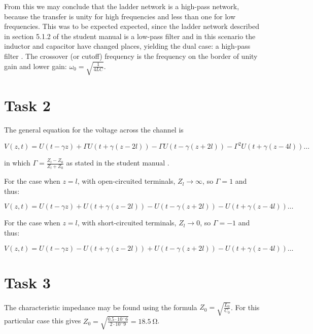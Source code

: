 \documentclass[11pt,titlepage]{report}
\begin{document}
From this we may conclude that the ladder network is a high-pass network, because the transfer is unity for high frequencies and less than one for low frequencies. This was to be expected expected, since the ladder network described in section 5.1.2 of the student manual is a low-pass filter and in this scenario the inductor and capacitor have changed places, yielding the dual case: a high-pass filter \cite[60]{epo4-manual}. The crossover (or cutoff) frequency is the frequency on the border of unity gain and lower gain: $\omega_0=\sqrt{\frac{1}{4LC}}$.

\section{Task 2}
The general equation for the voltage across the channel is 

\begin{equation}
	V(z,t)=U(t-\gamma z) + \Gamma U(t+\gamma(z-2l))-\Gamma U(t-\gamma(z+2l))-\Gamma^2U(t+\gamma(z-4l))\dots
\end{equation}

in which $\Gamma=\frac{Z_l-Z_0}{Z_l+Z_0}$ as stated in the student manual \cite[64]{epo4-manual}.

For the case when $z=l$, with open-circuited terminals, $Z_l \to \infty$, so $\Gamma=1$ and thus:

\begin{equation}
	V(z,t)=U(t-\gamma z) + U(t+\gamma(z-2l))- U(t-\gamma(z+2l))- U(t+\gamma(z-4l))\dots
\end{equation}

For the case when $z=l$, with short-circuited terminals, $Z_l \to 0$, so $\Gamma=-1$ and thus:

\begin{equation}
	V(z,t)=U(t-\gamma z) - U(t+\gamma(z-2l))+U(t-\gamma(z+2l))-U(t+\gamma(z-4l))\dots
\end{equation}


\section{Task 3}
The characteristic impedance may be found using the formula $Z_0=\sqrt{\frac{L_0}{C_0}}$. For this particular case this gives $Z_0=\sqrt{\frac{0.5\cdot10^-6}{2\cdot10^-9}}= \SI{18.5}{\ohm}$.
\end{document}
